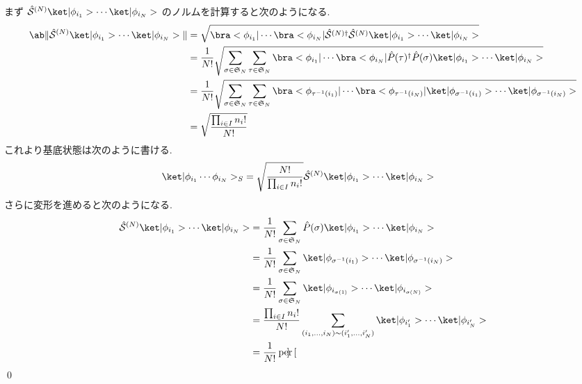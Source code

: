 \documentclass[uplatex,dvipdfmx,a4paper,11pt]{jlreq}
\makeatletter
\DeclareMathOperator{\per}{per}
\renewcommand{\SS}{\mathfrak{S}}
\renewcommand{\S}{\mathcal{S}}
\numberwithin{equation}{section}
\theoremstyle{definition}
\renewenvironment{proof}[1][\proofname]{\par
  \normalfont
  \topsep6\p@\@plus6\p@ \trivlist
  \item[\hskip\labelsep{\bfseries #1}\@addpunct{\bfseries}]\ignorespaces\quad\par
}{%
  \qed\endtrivlist\@endpefalse
}
\renewcommand\proofname{証明}
\makeatother
\begin{document}
\begin{proof}
  まず $\hat{\S}^{(N)}\ket|\phi_{i_1}>\cdots\ket|\phi_{i_N}>$ のノルムを計算すると次のようになる.
  \begin{align}
    \ab\|\hat{\S}^{(N)}\ket|\phi_{i_1}>\cdots\ket|\phi_{i_N}>\| & = \sqrt{\bra<\phi_{i_1}|\cdots\bra<\phi_{i_N}|\hat{\S}^{(N)\dagger}\hat{\S}^{(N)}\ket|\phi_{i_1}>\cdots\ket|\phi_{i_N}>}                                                                  \\
                                                                & = \frac{1}{N!}\sqrt{\sum_{\sigma\in\SS_N}\sum_{\tau\in\SS_N}\bra<\phi_{i_1}|\cdots\bra<\phi_{i_N}|\hat{P}(\tau)^\dagger\hat{P}(\sigma)\ket|\phi_{i_1}>\cdots\ket|\phi_{i_N}>}             \\
                                                                & = \frac{1}{N!}\sqrt{\sum_{\sigma\in\SS_N}\sum_{\tau\in\SS_N}\bra<\phi_{\tau^{-1}(i_1)}|\cdots\bra<\phi_{\tau^{-1}(i_N)}|\ket|\phi_{\sigma^{-1}(i_1)}>\cdots\ket|\phi_{\sigma^{-1}(i_N)}>} \\
                                                                & = \sqrt{\frac{\prod_{i\in I}n_i!}{N!}}
  \end{align}
  これより基底状態は次のように書ける.
  \begin{align}
    \ket|\phi_{i_1}\cdots\phi_{i_N}>_S & = \sqrt{\frac{N!}{\prod_{i\in I}n_i!}}\hat{\S}^{(N)}\ket|\phi_{i_1}>\cdots\ket|\phi_{i_N}>
  \end{align}
  さらに変形を進めると次のようになる.
  \begin{align}
    \hat{\S}^{(N)}\ket|\phi_{i_1}>\cdots\ket|\phi_{i_N}> & = \frac{1}{N!}\sum_{\sigma\in\SS_N}\hat{P}(\sigma)\ket|\phi_{i_1}>\cdots\ket|\phi_{i_N}>                             \\
                                                         & = \frac{1}{N!}\sum_{\sigma\in\SS_N}\ket|\phi_{\sigma^{-1}(i_1)}>\cdots\ket|\phi_{\sigma^{-1}(i_N)}>                  \\
                                                         & = \frac{1}{N!}\sum_{\sigma\in\SS_N}\ket|\phi_{i_{\sigma(1)}}>\cdots\ket|\phi_{i_{\sigma(N)}}>                        \\
                                                         & = \frac{\prod_{i\in I}n_i!}{N!}\sum_{(i_1,\ldots,i_N)\sim(i_1',\ldots,i_N')}\ket|\phi_{i_1'}>\cdots\ket|\phi_{i_N'}> \\
                                                         & = \frac{1}{N!}\per\begin{bmatrix}

\end{bmatrix}
\end{align}
\end{proof}
\end{document}
